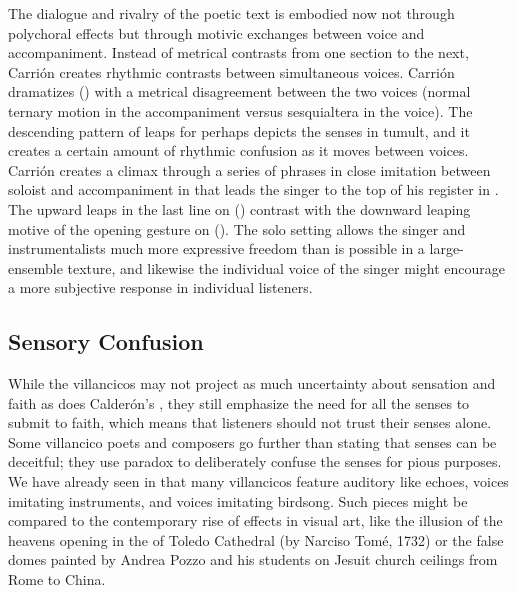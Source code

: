 The dialogue and rivalry of the poetic text is embodied now not through
polychoral effects but through motivic exchanges between voice and
accompaniment.
Instead of metrical contrasts from one section to the next, Carrión creates
rhythmic contrasts between simultaneous voices.
Carrión dramatizes  () with a metrical disagreement
between the two voices (normal ternary motion in the accompaniment versus
sesquialtera in the voice).
The descending pattern of leaps for  perhaps
depicts the senses in tumult, and it creates a certain amount of rhythmic
confusion as it moves between voices.
Carrión creates a climax through a series of phrases in close imitation between
soloist and accompaniment in  that leads the singer to the top
of his register in .
The upward leaps in the last line on  ()
contrast with the downward leaping motive of the opening gesture on
 ().
The solo setting allows the singer and instrumentalists much more expressive
freedom than is possible in a large-ensemble texture, and likewise the
individual voice of the singer might encourage a more subjective response in
individual listeners.


\subsection{Sensory Confusion}

While the  villancicos may not project as much
uncertainty about sensation and faith as does Calderón's , they still emphasize the need for all the senses to submit
to faith, which means that listeners should not trust their senses alone.
Some villancico poets and composers go further than stating that senses can be
deceitful; they use paradox to deliberately confuse the senses for pious
purposes.
We have already seen in  that many villancicos feature auditory
 like echoes, voices imitating instruments, and voices
imitating birdsong.
Such pieces might be compared to the contemporary rise of 
effects in visual art, like the illusion of the heavens opening in the
 of Toledo Cathedral (by Narciso Tomé, 1732) or the false
domes painted by Andrea Pozzo and his students on Jesuit church ceilings from
Rome to China.%
    \Autocites
    []{GroveArt}
    [110]{Bailey:Art}

